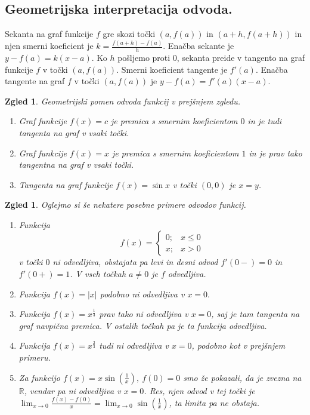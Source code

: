 \documentclass[10pt, a4paper]{article}
\newtheorem{zgled}[izr]{Zgled}
\newcommand{\R}{\mathbb {R}}
\newcommand{\limf}[3]{\lim_{#1 \to #2} {#3}}
\begin{document}
\subsection{Geometrijska interpretacija odvoda.}

Sekanta na graf funkcije $f$ gre skozi točki $(a, f(a))$ in $(a+h, f(a+h))$
in njen smerni koeficient je $k = \frac{f(a+h) - f(a)}{h}$. 
Enačba sekante je $y - f(a) = k(x-a)$. Ko $h$ pošljemo proti $0$, sekanta preide v tangento
na graf funkcije $f$ v točki $(a, f(a)).$
Smerni koeficient tangente je $f'(a)$. 
Enačba tangente na graf $f$ v točki $(a, f(a))$ je $y - f(a) = f'(a)(x-a).$

\begin{zgled}
    Geometrijski pomen odvoda funkcij v prejšnjem zgledu.
    \begin{enumerate}
        \item Graf funkcije $f(x) = c$ je premica s smernim koeficientom $0$ in je tudi tangenta na graf v vsaki točki.
        \item Graf funkcije $f(x) = x$ je premica s smernim koeficientom $1$ in je prav tako tangentna na graf v vsaki točki.
        \item Tangenta na graf funkcije $f(x) = \sin{x}$ v točki $(0,0)$ je $x = y$.
    \end{enumerate}
\end{zgled}
\vspace{3mm}
\begin{zgled}
    Oglejmo si še nekatere posebne primere odvodov funkcij.
    \begin{enumerate}
        \item Funkcija $$f(x) = \begin{cases}
            0; & x \leq 0\\
            x; & x > 0
        \end{cases}$$ v točki $0$ ni odvedljiva, obstajata pa levi in desni odvod $f'(0-) = 0$ in $f'(0+) = 1$.
        V vseh točkah $a \neq 0$ je $f$ odvedljiva.
        \item Funkcija $f(x) = |x|$ podobno ni odvedljiva v $x = 0.$
        \item Funkcija $f(x) = x^{\frac{1}{3}}$ prav tako ni odvedljiva v $x = 0$, saj je tam tangenta na graf navpična premica.
        V ostalih točkah pa je ta funkcija odvedljiva.
        \item Funkcija $f(x) = x^{\frac{2}{3}}$ tudi ni odvedljiva v $x = 0$, podobno kot v prejšnjem primeru.
        \item Za funkcijo $f(x) = x \sin{\left(\frac{1}{x}\right)},\ f(0) = 0$ smo že pokazali, da je zvezna na $\R$,
        vendar pa ni odvedljiva v $x = 0$. Res, njen odvod v tej točki je $\limf{x}{0}{\frac{f(x)- f(0)}{x}} = \limf{x}{0}{\sin{\left(\frac{1}{x}\right)}}$, ta limita pa ne obstaja.
    \end{enumerate}
\end{zgled}
\end{document}
